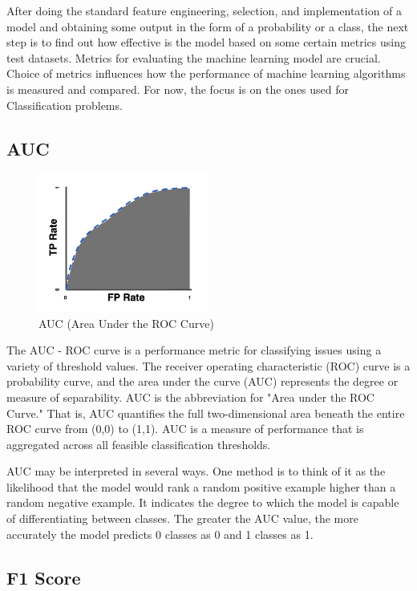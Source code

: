After doing the standard feature engineering, selection, and implementation of a model and obtaining some output in the form of a probability or a class, the next step is to find out how effective is the model based on some certain metrics using test datasets. Metrics for evaluating the machine learning model are crucial. Choice of metrics influences how the performance of machine learning algorithms is measured and compared. For now, the focus is on the ones used for Classification problems.


\subsection{AUC}

\begin{figure}[htbp!]
\centering
\includegraphics[width=0.5\textwidth]{images/background/auc_roc.png}
\caption{AUC (Area Under the ROC Curve)}
\label{fig:roc_auc}
\end{figure}


The AUC - ROC curve is a performance metric for classifying issues using a variety of threshold values. The receiver operating characteristic (ROC) curve is a probability curve, and the area under the curve (AUC) represents the degree or measure of separability. AUC is the abbreviation for "Area under the ROC Curve." That is, AUC quantifies the full two-dimensional area beneath the entire ROC curve from (0,0) to (1,1). AUC is a measure of performance that is aggregated across all feasible classification thresholds. 

AUC may be interpreted in several ways. One method is to think of it as the likelihood that the model would rank a random positive example higher than a random negative example. It indicates the degree to which the model is capable of differentiating between classes. The greater the AUC value, the more accurately the model predicts 0 classes as 0 and 1 classes as 1. 

\subsection{F1 Score}

